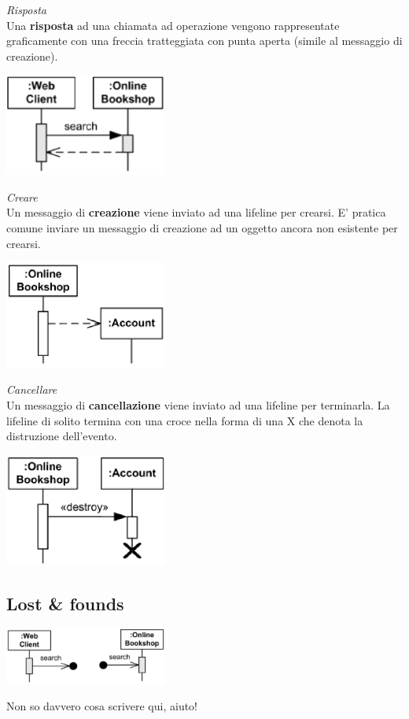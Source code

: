 \documentclass{article}
\begin{document}
\textit{Risposta}\\
Una \textbf{risposta} ad una chiamata ad operazione vengono rappresentate graficamente con una freccia tratteggiata con punta aperta (simile al messaggio di creazione).
\begin{center}
    \includegraphics[width=0.4\textwidth]{foto 7.png}\\
\end{center}
\textit{Creare}\\
Un messaggio di \textbf{creazione} viene inviato ad una lifeline per crearsi. E' pratica comune inviare un messaggio di creazione ad un oggetto ancora non esistente per crearsi.
\begin{center}
    \includegraphics[width=0.4\textwidth]{foto 8.png}\\
\end{center}
\textit{Cancellare}\\
Un messaggio di \textbf{cancellazione} viene inviato ad una lifeline per terminarla. La lifeline di solito termina con una croce nella forma di una X che denota la distruzione dell'evento.
\begin{center}
    \includegraphics[width=0.4\textwidth]{foto 9.png}\\
\end{center}

\subsection*{Lost \& founds}
\large
\begin{center}
    \includegraphics[width=0.4\textwidth]{foto 10.png}\\
\end{center}
Non so davvero cosa scrivere qui, aiuto!
\end{document}

